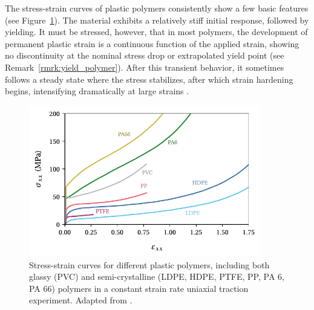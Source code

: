 The stress-strain curves of plastic polymers consistently show a few basic features (see Figure~\ref{fig:response_plastic_polymer}).
The material exhibits a relatively stiff initial response, followed by yielding.
It must be stressed, however, that in most polymers, the development of permanent plastic strain is a continuous function of the applied strain, showing no discontinuity at the nominal stress drop or extrapolated yield point \citep{wardReviewYieldBehaviour1971} (see Remark~\ref{rmrk:yield_polymer}).
After this transient behavior, it sometimes follows a steady state where the stress stabilizes, after which strain hardening begins, intensifying dramatically at large strains \citep{hissNetworkStretchingSlip1999,callister2014materials,makradiTwophaseSelfconsistentModel2005}.
\begin{figure}[hbp]
	\centering
	\includegraphics[width=0.9\textwidth]{figures/response_plastic_polymer}
	\caption{Stress-strain curves for different plastic polymers, including both glassy (PVC) and semi-crystalline (LDPE, HDPE, PTFE, PP, PA 6, PA 66) polymers in a constant strain rate uniaxial traction experiment. Adapted from \cite{gsellYieldTransientEffects1981}.}
\label{fig:response_plastic_polymer}
\end{figure}

